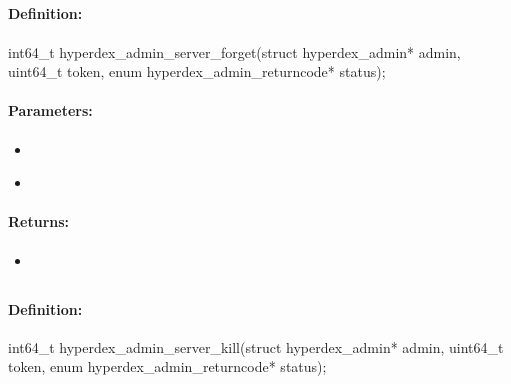 \pagebreak
\subsection{}
\label{api:c:server_forget}


\paragraph{Definition:}
\begin{ccode}
int64_t hyperdex_admin_server_forget(struct hyperdex_admin* admin,
        uint64_t token,
        enum hyperdex_admin_returncode* status);
\end{ccode}

\paragraph{Parameters:}
\begin{itemize}[noitemsep]
\item {}\\

\item {}\\

\end{itemize}

\paragraph{Returns:}
\begin{itemize}[noitemsep]
\item {}\\

\end{itemize}

\pagebreak
\subsection{}
\label{api:c:server_kill}


\paragraph{Definition:}
\begin{ccode}
int64_t hyperdex_admin_server_kill(struct hyperdex_admin* admin,
        uint64_t token,
        enum hyperdex_admin_returncode* status);
\end{ccode}

